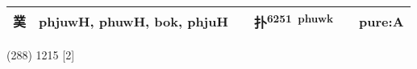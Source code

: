 \documentclass[14pt,a4paper]{scrartcl}
\begin{document}
\begin{longtable}[c]{@{}llllll@{}}
\begin{minipage}[t]{0.14\columnwidth}
菐
\strut\end{minipage} &
\begin{minipage}[t]{0.14\columnwidth}\raggedright\strut
phjuwH, phuwH, bok, phjuH
\strut\end{minipage} &
\begin{minipage}[t]{0.14\columnwidth}\raggedright\strut
\strut\end{minipage} &
\begin{minipage}[t]{0.14\columnwidth}\raggedright\strut
扑\textsuperscript{6251~phuwk}
\strut\end{minipage} &
\begin{minipage}[t]{0.14\columnwidth}\raggedright\strut
\strut\end{minipage} &
\begin{minipage}[t]{0.14\columnwidth}\raggedright\strut
pure:A
\strut\end{minipage}\tabularnewline
\bottomrule
\end{longtable}

(288) 1215 {[}2{]}
\end{document}
